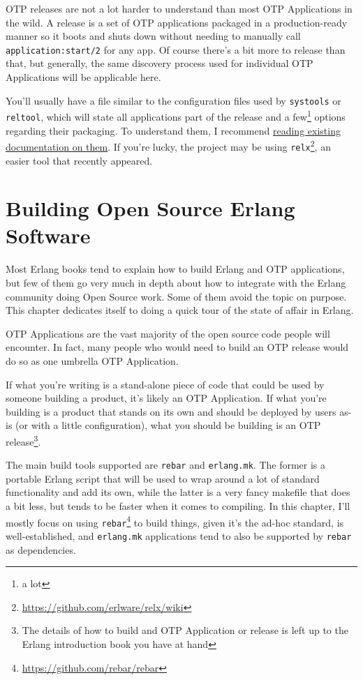 \documentclass[11pt, oneside]{book}   	%
\newcommand{\app}[1]{\Verb`#1`}
\newcommand{\module}[1]{\Verb`#1`}
\newcommand{\function}[1]{\Verb`#1`}
\begin{document}
OTP releases are not a lot harder to understand than most OTP Applications in the wild. A release is a set of OTP applications packaged in a production-ready manner so it boots and shuts down without needing to manually call \function{application:start/2} for any app. Of course there's a bit more to release than that, but generally, the same discovery process used for individual OTP Applications will be applicable here.

You'll usually have a file similar to the configuration files used by \module{systools} or \module{reltool}, which will state all applications part of the release and a few\footnote{a lot} options regarding their packaging. To understand them, I recommend \href{http://learnyousomeerlang.com/release-is-the-word}{reading existing documentation on them}. If you're lucky, the project may be using \app{relx}\footnote{\href{https://github.com/erlware/relx/wiki}{https://github.com/erlware/relx/wiki}}, an easier tool that recently appeared.


\chapter{Building Open Source Erlang Software}
\label{chap:building-open-source-erlang-software}

Most Erlang books tend to explain how to build Erlang and OTP applications, but few of them go very much in depth about how to integrate with the Erlang community doing Open Source work. Some of them avoid the topic on purpose. This chapter dedicates itself to doing a quick tour of the state of affair in Erlang.

OTP Applications are the vast majority of the open source code people will encounter. In fact, many people who would need to build an OTP release would do so as one umbrella OTP Application. 

If what you're writing is a stand-alone piece of code that could be used by someone building a product, it's likely an OTP Application. If what you're building is a product that stands on its own and should be deployed by users as-is (or with a little configuration), what you should be building is an OTP release\footnote{The details of how to build and OTP Application or release is left up to the Erlang introduction book you have at hand}.

The main build tools supported are \app{rebar} and \app{erlang.mk}. The former is a portable Erlang script that will be used to wrap around a lot of standard functionality and add its own, while the latter is a very fancy makefile that does a bit less, but tends to be faster when it comes to compiling. In this chapter, I'll mostly focus on using \app{rebar}\footnote{\href{https://github.com/rebar/rebar}{https://github.com/rebar/rebar}} to build things, given it's the ad-hoc standard, is well-established, and \app{erlang.mk} applications tend to also be supported by \app{rebar} as dependencies.
\end{document}
